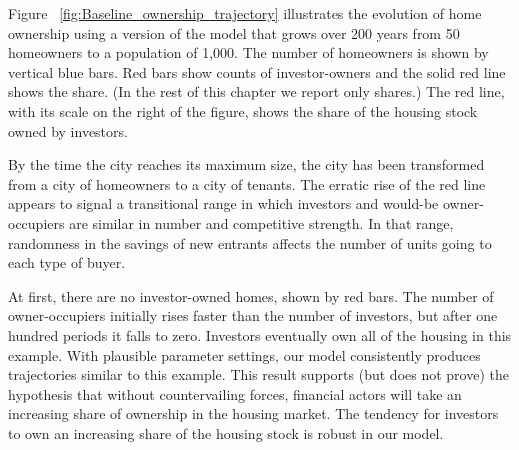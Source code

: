 Figure ~\ref{fig:Baseline_ownership_trajectory} illustrates the evolution of home ownership using a version of the model that grows over 200 years from 50 homeowners to a population of 1,000. The number of homeowners is shown by vertical blue bars.  Red bars show counts of investor-owners and the solid red line shows the share. (In the rest of this chapter we report only shares.) %
The red line, with its scale on the right of the figure, shows the share of the housing stock owned by investors. 

By the time the city reaches its maximum size, the city has been transformed from a city of homeowners to a city of tenants. The erratic rise of the red line appears to signal a transitional range in which investors and would-be owner-occupiers are similar in number and competitive strength. In that range, randomness in the savings of new entrants affects the number of units going to each type of buyer. 



At first, there are no investor-owned homes, shown by red bars. The number of owner-occupiers initially rises faster than the number of investors, but after one hundred periods it falls to zero. Investors eventually own all of the housing in this example.  With plausible parameter settings, our model consistently produces trajectories similar to this example. This result supports (but does not prove) the hypothesis that without countervailing forces, financial actors will take an increasing share of ownership in the housing market. The tendency for investors to own an increasing share of the housing stock is robust in our model. 

